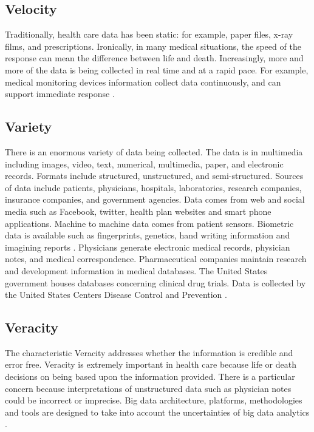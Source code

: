 \documentclass[sigconf]{acmart}
\begin{document}
\subsection{Velocity}

Traditionally, health care data has been static: for example, paper files, x-ray films, and prescriptions. Ironically, in many medical situations, the speed of the response can mean the difference between life and death. Increasingly, more and more of the data is being collected in real time and at a rapid pace. For example, medical monitoring devices information collect data continuously, and can support immediate response \cite{springer}. 

\subsection{Variety}

There is an enormous variety of data being collected. The data is in multimedia including images, video, text, numerical, multimedia, paper, and electronic records.  Formats include structured, unstructured, and semi-structured.  Sources of data include patients, physicians, hospitals, laboratories, research companies, insurance companies, and government agencies. Data comes from web and social media such as Facebook, twitter, health plan websites and smart phone applications. Machine to machine data comes from patient sensors. Biometric data is available such as fingerprints, genetics, hand writing information and imagining reports \cite{springer}. Physicians generate electronic medical records, physician notes, and medical correspondence. Pharmaceutical companies maintain research and development information in medical databases. The United States government houses databases concerning clinical drug trials. Data is collected by the United States Centers Disease Control and Prevention \cite{www-google-CIO}. 

\subsection{Veracity}

The characteristic Veracity addresses whether the information is credible and error free. Veracity is extremely important in health care because life or death decisions on being based upon the information provided. There is a particular concern because interpretations of unstructured data such as physician notes could be incorrect or imprecise. Big data architecture, platforms, methodologies and tools are designed to take into account the uncertainties of big data analytics \cite{springer}. 
\end{document}
